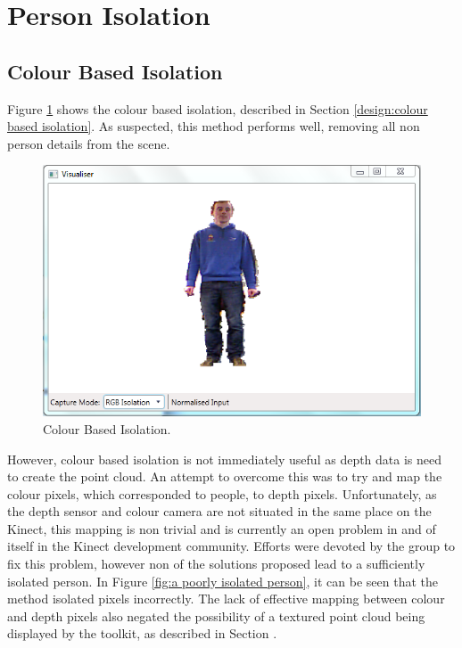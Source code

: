 \section{Person Isolation}
\label{testing:person isolation}

\subsection{Colour Based Isolation}
\label{testing:colour based isolation}
Figure \ref{fig:colour based cut off} shows the colour based isolation, described in Section \ref{design:colour based isolation}.
As suspected, this method performs well, removing all non person  details from the scene.\\

\begin{figure}[h]
\begin{center}
\includegraphics[scale=0.8]{./testing/parse4} 
\end{center}
\caption{Colour Based Isolation.}
\label{fig:colour based cut off}
\end{figure} 

However, colour based isolation is not immediately useful as depth data is need to create the point cloud. An attempt to overcome this was to try and map the colour pixels, which corresponded to people, to depth pixels.
Unfortunately, as the depth sensor and colour camera are not situated in the same place on the Kinect, this mapping is non trivial and is currently an open problem in and of itself in the Kinect development community.
Efforts were devoted by the group to fix this problem, however non of the solutions proposed lead to a sufficiently isolated person.
In Figure \ref{fig:a poorly isolated person}, it can be seen that the method isolated pixels incorrectly. 
The lack of effective mapping between colour and depth pixels also negated the possibility of a textured point cloud being displayed by the toolkit, as described in Section .

